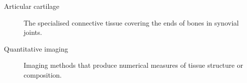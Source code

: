 
\begin{description}
  \item[Articular cartilage] The specialised connective tissue covering the
  ends of bones in synovial joints.
  \item[Quantitative imaging] Imaging methods that produce numerical measures
  of tissue structure or composition.
\end{description}

